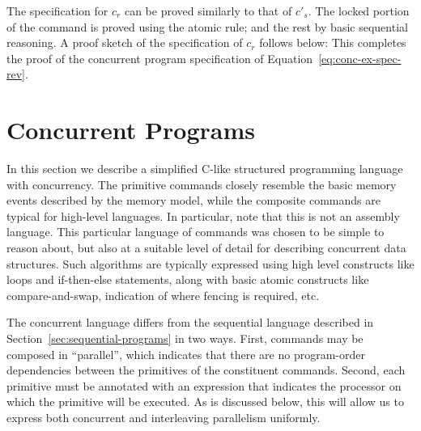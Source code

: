 \documentclass[11pt]{report}         %
\begin{document}
The specification for $c_r$ can be proved similarly to that of $c'_s$. The locked portion of the command is proved using the atomic rule; and the rest by basic sequential reasoning. A proof sketch of the specification of $c_r$ follows below: 
This completes the proof of the concurrent program specification of Equation~\ref{eq:conc-ex-spec-rev}.

\section{Concurrent Programs}
\label{sec:programming-language}

In this section we describe a simplified C-like structured programming language with concurrency. The primitive commands closely resemble the basic memory events described by the memory model, while the composite commands are typical for high-level languages. In particular, note that this is not an assembly language. This particular language of commands was chosen to be simple to reason about, but also at a suitable level of detail for describing concurrent data structures. Such algorithms are typically expressed using high level constructs like loops and if-then-else statements, along with basic atomic constructs like compare-and-swap, indication of where fencing is required, etc. 

The concurrent language differs from the sequential language described in Section~\ref{sec:sequential-programs} in two ways. First, commands may be composed in ``parallel'', which indicates that there are no program-order dependencies between the primitives of the constituent commands. Second, each primitive must be annotated with an expression that indicates the processor on which the primitive will be executed. As is discussed below, this will allow us to express both concurrent and interleaving parallelism uniformly.
\end{document}
